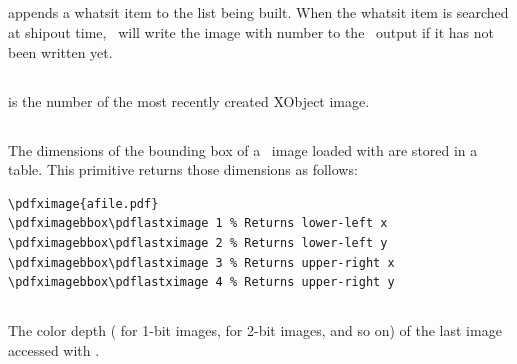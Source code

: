 \documentclass{pdftexmanual}
\begin{document}
\subsection{}

 appends a whatsit item to the list being built. When
the whatsit item is searched at shipout time, \PDFTEX\ will write the image
with number  to the \PDF\ output if it has not been
written yet.

\subsection{}

\type{\pdflastximage} is the number of the most recently created XObject
image.

\subsection{}

The dimensions of the bounding box of a \PDF\ image loaded with
 are stored in a table. This primitive returns those
dimensions as follows:

\begin{verbatim}
\pdfximage{afile.pdf}
\pdfximagebbox\pdflastximage 1 % Returns lower-left x
\pdfximagebbox\pdflastximage 2 % Returns lower-left y
\pdfximagebbox\pdflastximage 3 % Returns upper-right x
\pdfximagebbox\pdflastximage 4 % Returns upper-right y
\end{verbatim}

\subsection{}

The color depth ( for 1-bit images,  for 2-bit images,
and so on) of the last image accessed with .

\subsection{}
\end{document}
